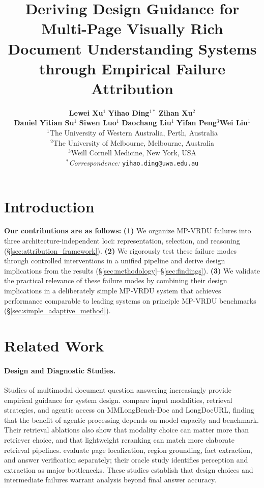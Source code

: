 \documentclass[11pt]{article}
\title{Deriving Design Guidance for Multi-Page Visually Rich Document Understanding Systems through Empirical Failure Attribution}
\author{
  \textbf{Lewei Xu}$^{1}$ \quad \textbf{Yihao Ding}$^{1*}$ \quad \textbf{Zihan Xu}$^2$ \\ \quad \textbf{Daniel Yitian Su$^{1}$} \quad
  \textbf{Siwen Luo}$^1$ \quad \textbf{Daochang Liu}$^1$ \quad \textbf{Yifan Peng}$^{3}$\quad \textbf{Wei Liu}$^1$ \\[4pt]
  $^1$The University of Western Australia, Perth, Australia \\[2pt]
  $^2$The University of Melbourne, Melbourne, Australia \\[2pt]
  $^{3}$Weill Cornell Medicine, New York, USA \\[2pt]
  $^*$\textit{Correspondence:}
  \texttt{yihao.ding@uwa.edu.au}
}
\begin{document}
\maketitle

\begin{abstract}

\end{abstract}

\section{Introduction}






\textbf{Our contributions are as follows:} \textbf{(1)} We organize MP-VRDU failures into three architecture-independent loci: representation, selection, and reasoning (\S\ref{sec:attribution_framework}). \textbf{(2)} We rigorously test these failure modes through controlled interventions in a unified pipeline and derive design implications from the results (\S\ref{sec:methodology}--\S\ref{sec:findings}). \textbf{(3)} We validate the practical relevance of these failure modes by combining their design implications in a deliberately simple MP-VRDU system that achieves performance comparable to leading systems on principle MP-VRDU benchmarks (\S\ref{sec:simple_adaptive_method}).


\clearpage
\section{Related Work}
\label{sec:related_work}

\paragraph{Design and Diagnostic Studies.} Studies of multimodal document question answering increasingly provide empirical guidance for system design. \citeauthor{ak2026empirical} compare input modalities, retrieval strategies, and agentic access on MMLongBench-Doc and LongDocURL, finding that the benefit of agentic processing depends on model capacity and benchmark. Their retrieval ablations also show that modality choice can matter more than retriever choice, and that lightweight reranking can match more elaborate retrieval pipelines. \citeauthor{feng2026docscope} evaluate page localization, region grounding, fact extraction, and answer verification separately; their oracle study identifies perception and extraction as major bottlenecks. These studies establish that design choices and intermediate failures warrant analysis beyond final answer accuracy.
\end{document}
